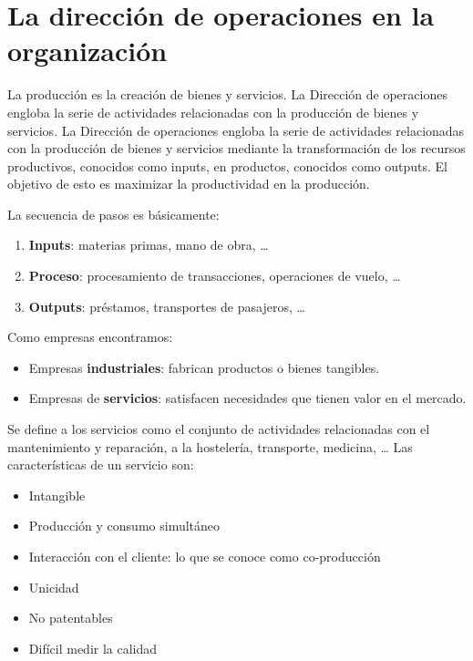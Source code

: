 \documentclass[12pt]{book} %
\providecommand{\tightlist}{%
  \setlength{\itemsep}{0pt}\setlength{\parskip}{0pt}}
\begin{document}
\hypertarget{la-direcciuxf3n-de-operaciones-en-la-organizaciuxf3n}{%
\section{La dirección de operaciones en la
organización}\label{la-direcciuxf3n-de-operaciones-en-la-organizaciuxf3n}}

La producción es la creación de bienes y servicios. La Dirección de
operaciones engloba la serie de actividades relacionadas con la
producción de bienes y servicios. La Dirección de operaciones engloba la
serie de actividades relacionadas con la producción de bienes y
servicios mediante la transformación de los recursos productivos,
conocidos como inputs, en productos, conocidos como outputs. El objetivo
de esto es maximizar la productividad en la producción.

La secuencia de pasos es básicamente:

\begin{enumerate}
\def\labelenumi{\arabic{enumi}.}
\tightlist
\item
  \textbf{Inputs}: materias primas, mano de obra, \ldots{}\\
\item
  \textbf{Proceso}: procesamiento de transacciones, operaciones de
  vuelo, \ldots{}\\
\item
  \textbf{Outputs}: préstamos, transportes de pasajeros, \ldots{}
\end{enumerate}

Como empresas encontramos:

\begin{itemize}
\tightlist
\item
  Empresas \textbf{industriales}: fabrican productos o bienes
  tangibles.\\
\item
  Empresas de \textbf{servicios}: satisfacen necesidades que tienen
  valor en el mercado.
\end{itemize}

Se define a los servicios como el conjunto de actividades relacionadas
con el mantenimiento y reparación, a la hostelería, transporte,
medicina, \ldots{} Las características de un servicio son:

\begin{itemize}
\tightlist
\item
  Intangible\\
\item
  Producción y consumo simultáneo\\
\item
  Interacción con el cliente: lo que se conoce como co-producción\\
\item
  Unicidad\\
\item
  No patentables\\
\item
  Difícil medir la calidad
\end{itemize}
\end{document}
